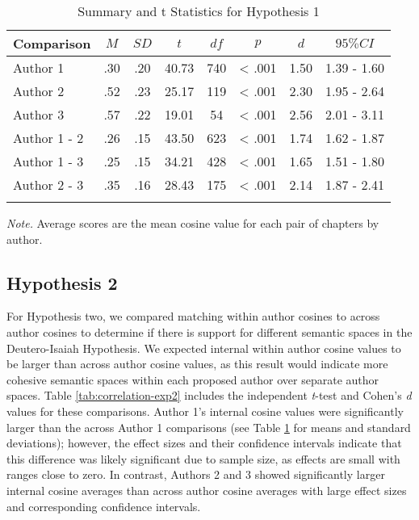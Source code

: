 \documentclass[english,man]{apa6}
\newcounter{author}
\theoremstyle{definition}
\theoremstyle{definition}
\theoremstyle{definition}
\theoremstyle{remark}
\begin{document}
\begin{table}[tbp]
\begin{center}
\begin{threeparttable}
\caption{\label{tab:correlation-exp1}Summary and t Statistics for Hypothesis 1}
\begin{tabular}{lccccccc}
\toprule
Comparison & $M$ & $SD$ & $t$ & $df$ & $p$ & $d$ & $95\% CI$\\
\midrule
Author 1 & .30 & .20 & 40.73 & 740 & < .001 & 1.50 & 1.39  -  1.60\\
Author 2 & .52 & .23 & 25.17 & 119 & < .001 & 2.30 & 1.95  -  2.64\\
Author 3 & .57 & .22 & 19.01 & 54 & < .001 & 2.56 & 2.01  -  3.11\\
Author 1 - 2 & .26 & .15 & 43.50 & 623 & < .001 & 1.74 & 1.62  -  1.87\\
Author 1 - 3 & .25 & .15 & 34.21 & 428 & < .001 & 1.65 & 1.51  -  1.80\\
Author 2 - 3 & .35 & .16 & 28.43 & 175 & < .001 & 2.14 & 1.87  -  2.41\\
\bottomrule
\addlinespace
\end{tabular}
\begin{tablenotes}[para]
\textit{Note.} Average scores are the mean cosine value for each pair of chapters by author.
\end{tablenotes}
\end{threeparttable}
\end{center}
\end{table}

\subsection{Hypothesis 2}\label{hypothesis-2-1}

For Hypothesis two, we compared matching within author cosines to across
author cosines to determine if there is support for different semantic
spaces in the Deutero-Isaiah Hypothesis. We expected internal within
author cosine values to be larger than across author cosine values, as
this result would indicate more cohesive semantic spaces within each
proposed author over separate author spaces. Table
\ref{tab:correlation-exp2} includes the independent \emph{t}-test and
Cohen's \emph{d} values for these comparisons. Author 1's internal
cosine values were significantly larger than the across Author 1
comparisons (see Table \ref{tab:correlation-exp1} for means and standard
deviations); however, the effect sizes and their confidence intervals
indicate that this difference was likely significant due to sample size,
as effects are small with ranges close to zero. In contrast, Authors 2
and 3 showed significantly larger internal cosine averages than across
author cosine averages with large effect sizes and corresponding
confidence intervals.
\end{document}
